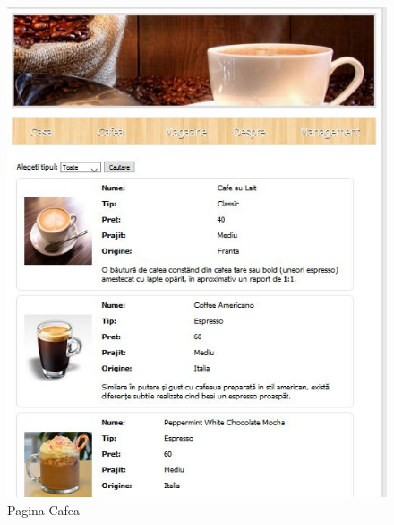 \begin{figure}[!ht]
	
	\centering
	
	\includegraphics[width=1.0\textwidth]{Cattura1.JPG}
	
	\caption{Pagina Cafea}
	
	\label{Im_label}
	
\end{figure}

